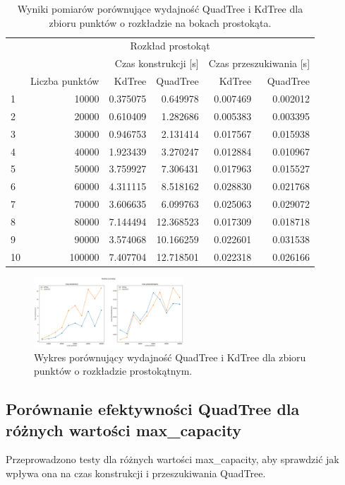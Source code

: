 \documentclass{lab}
\begin{document}
\begin{table}[H]
\centering
\begin{tabular}{lrrrrr}
  \toprule
   & \multicolumn{5}{c}{Rozkład prostokąt} \\
   &  & \multicolumn{2}{r}{Czas konstrukcji [s]} & \multicolumn{2}{r}{Czas przeszukiwania [s]} \\
   & Liczba punktów & KdTree & QuadTree & KdTree & QuadTree \\
  \midrule
 1 & 10000 & 0.375075 & 0.649978 & 0.007469 & 0.002012 \\
2 & 20000 & 0.610409 & 1.282686 & 0.005383 & 0.003395 \\
3 & 30000 & 0.946753 & 2.131414 & 0.017567 & 0.015938 \\
4 & 40000 & 1.923439 & 3.270247 & 0.012884 & 0.010967 \\
5 & 50000 & 3.759927 & 7.306431 & 0.017963 & 0.015527 \\
6 & 60000 & 4.311115 & 8.518162 & 0.028830 & 0.021768 \\
7 & 70000 & 3.606635 & 6.099763 & 0.025063 & 0.029072 \\
8 & 80000 & 7.144494 & 12.368523 & 0.017309 & 0.018718 \\
9 & 90000 & 3.574068 & 10.166259 & 0.022601 & 0.031538 \\
10 & 100000 & 7.407704 & 12.718501 & 0.022318 & 0.026166 \\
  \bottomrule
  \end{tabular}
\caption{Wyniki pomiarów porównujące wydajność QuadTree i KdTree dla zbioru punktów o rozkładzie na bokach prostokąta.}
\label{tab:rectangle_time}
\end{table}

\begin{figure}[H]
  \centering
  \includegraphics[width=0.5\textwidth]{resources/rectangle_graph.png}
  \caption{Wykres porównujący wydajność QuadTree i KdTree dla zbioru punktów o rozkładzie prostokątnym.}
  \label{fig:rectangle_graph}
\end{figure}

\newpage
\subsection{Porównanie efektywności QuadTree dla różnych wartości max\_capacity}
Przeprowadzono testy dla różnych wartości max\_capacity, aby sprawdzić jak wpływa ona na czas konstrukcji i przeszukiwania QuadTree.
\end{document}
